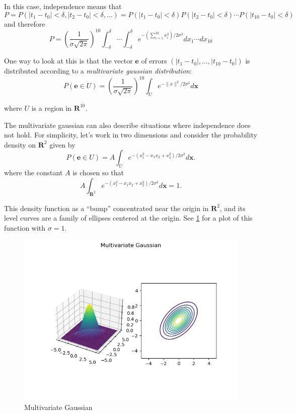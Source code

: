\documentclass[
]{article}
\begin{document}
In this case, independence means that \[
P=P(|t_1-t_0|<\delta,|t_2-t_0|<\delta,\ldots) = P(|t_1-t_0|<\delta)P(|t_2-t_0|<\delta)\cdots P(|t_{10}-t_{0}|<\delta)
\] and therefore \[
P = \left(\frac{1}{\sigma\sqrt{2\pi}}\right)^{10}\int_{-\delta}^{\delta}\cdots\int_{-\delta}^{\delta}
e^{-(\sum_{i=1}^{10} x_i^2)/2\sigma^2} dx_1\cdots dx_{10}
\]

One way to look at this is that the vector \(\mathbf{e}\) of errors
\((|t_1-t_0|,\ldots,|t_{10}-t_0|)\) is distributed according to a
\emph{multivariate gaussian distribution}: \begin{equation}
P(\mathbf{e}\in U) =\left(\frac{1}{\sigma\sqrt{2\pi}}\right)^{10}\int_{U} 
e^{-\|x\|^2/2\sigma^2} d\mathbf{x}
\label{eq:multivariategaussian}\end{equation}

where \(U\) is a region in \(\mathbf{R}^{10}\).

The multivariate gaussian can also describe situations where
independence does not hold. For simplicity, let's work in two dimensions
and consider the probability density on \(\mathbf{R}^{2}\) given by \[
P(\mathbf{e}\in U) = A\int_{U} e^{-(x_1^2-x_1x_2+x_2^2)/2\sigma^2} d\mathbf{x}.
\] where the constant \(A\) is chosen so that \[
A\int_{\mathbf{R}^{2}}e^{-(x_1^2-x_1x_2+x_2^2)/2\sigma^2}d\mathbf{x} = 1.
\]

This density function as a ``bump'' concentrated near the origin in
\(\mathbf{R}^{2}\), and its level curves are a family of ellipses
centered at the origin. See \cref{fig:multivariate} for a plot of this
function with \(\sigma=1\).

\begin{figure}
\hypertarget{fig:multivariate}{%
\centering
\includegraphics{../img/ellipse.png}
\caption{Multivariate Gaussian}\label{fig:multivariate}
}
\end{figure}
\end{document}
